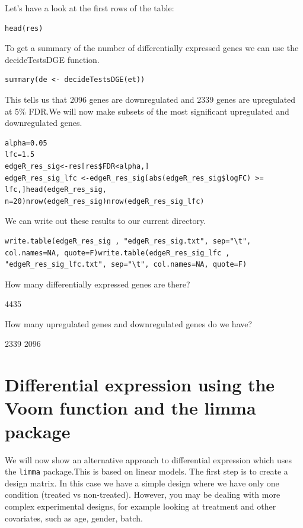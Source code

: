 \begin{steps}
\begin{steps}
Let's have a look at the first rows of the table:
\begin{lstlisting}
head(res)
\end{lstlisting}
\end{steps}


To get a summary of the number of differentially expressed genes we can use the decideTestsDGE function.
\begin{steps}
\begin{lstlisting}summary(de <- decideTestsDGE(et))
\end{lstlisting}
\end{steps}
This tells us that 2096 genes are downregulated and 2339 genes are upregulated at 5\% FDR.We will now make subsets of the most significant upregulated and downregulated genes.

\begin{steps}
\begin{lstlisting}
alpha=0.05
lfc=1.5
edgeR_res_sig<-res[res$FDR<alpha,]
edgeR_res_sig_lfc <-edgeR_res_sig[abs(edgeR_res_sig$logFC) >= lfc,]head(edgeR_res_sig, n=20)nrow(edgeR_res_sig)nrow(edgeR_res_sig_lfc)

\end{lstlisting}
\end{steps}
We can write out these results to our current directory.
\begin{steps}
\begin{lstlisting}
write.table(edgeR_res_sig , "edgeR_res_sig.txt", sep="\t", col.names=NA, quote=F)write.table(edgeR_res_sig_lfc , "edgeR_res_sig_lfc.txt", sep="\t", col.names=NA, quote=F)
\end{lstlisting}

\end{steps}

\begin{questions}
How many differentially expressed genes are there? 
\begin{answer}
4435
\end{answer}

How many upregulated genes and downregulated genes do we have?
\begin{answer}
2339
2096
\end{answer}

\end{questions}

\newpage
\section{Differential expression using the Voom function and the limma package}
We will now show an alternative approach to differential expression which uses the \texttt{limma} package.This is based on linear models. The first step is to create a design matrix. In this case we have a simple design where we have only one condition (treated vs non-treated). However, you may be dealing with more complex experimental designs, for example looking at treatment and other covariates, such as age, gender, batch.


\end{steps}
